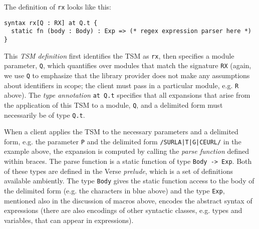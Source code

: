 The definition of \lstinline{rx} looks like this:
\begin{lstlisting}[numbers=none]
syntax rx[Q : RX] at Q.t {
  static fn (body : Body) : Exp => (* regex expression parser here *)
}
\end{lstlisting}
This \emph{TSM definition} first identifies the TSM as \lstinline{rx}, then specifies a module parameter, \lstinline{Q}, which quantifies over modules that match the signature \lstinline{RX} (again, we use \lstinline{Q} to emphasize that the library provider does not make any assumptions about identifiers in scope; the client must pass in a particular module, e.g. \lstinline{R} above). The \emph{type annotation} \lstinline{at Q.t} specifies that all expansions that arise from the application of this TSM to a module, \lstinline{Q}, and a delimited form must necessarily be of type \lstinline{Q.t}. 

When a client applies the TSM to the necessary parameters and a delimited form, e.g. the parameter \lstinline{P} and the delimited form \lstinline{/SURLA|T|G|CEURL/} in the example above, the expansion is computed by calling the \emph{parse function} defined within braces. The parse function is a static function of type \lstinline{Body -> Exp}. Both of these types are defined in the Verse \emph{prelude}, which is a set of definitions available ambiently. The type \lstinline{Body} gives the static function access to the {body} of the delimited form (e.g. the characters in blue above) and the type \lstinline{Exp}, mentioned also in the discussion of macros above,  encodes the abstract syntax of expressions (there are also encodings of other syntactic classes, e.g. types and variables, that can appear in expressions). %

